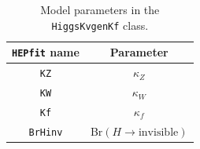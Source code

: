 \documentclass[preprint,3p,12pt]{elsarticle}
\newcommand{\HEPfit}{\texttt{HEPfit}\xspace}
\begin{document}
\begin{table}[tb]
 \centering
 \caption{Model parameters in the {\tt HiggsKvgenKf} class.}\vspace{0.2cm}
  \begin{tabular}{| c | c | }
\hline
%
\textbf{\HEPfit name}&
\textbf{Parameter}\\
%
\hline
 {\tt KZ}&
$\kappa_Z$\\
%
 {\tt KW}&
$\kappa_W$\\
%
 {\tt Kf}&
$\kappa_f$\\
%
 {\tt BrHinv}&
Br$(H\to \mathrm{invisible})$\\
\hline
  \end{tabular}
 \label{tab:HiggsKvgenKfpars}
\end{table} 




\end{document}
